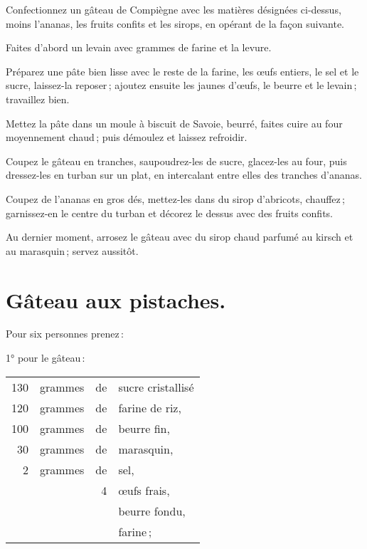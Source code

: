 Confectionnez un gâteau de Compiègne avec les matières désignées ci-dessus,
moins l'ananas, les fruits confits et les sirops, en opérant de la façon suivante.

Faites d'abord un levain avec {\mmm} grammes de farine et la levure.

Préparez une pâte bien lisse avec le reste de la farine, les œufs entiers, le
sel et le sucre, laissez-la reposer ; ajoutez ensuite les jaunes d'œufs, le
beurre et le levain ; travaillez bien.

Mettez la pâte dans un moule à biscuit de Savoie, beurré, faites cuire au four
moyennement chaud ; puis démoulez et laissez refroidir.

Coupez le gâteau en tranches, saupoudrez-les de sucre, glacez-les au four, puis
dressez-les en turban sur un plat, en intercalant entre elles des tranches
d'ananas.

Coupez de l'ananas en gros dés, mettez-les dans du sirop d'abricots, chauffez ;
garnissez-en le centre du turban et décorez le dessus avec des fruits confits.

Au dernier moment, arrosez le gâteau avec du sirop chaud parfumé au kirsch et
au marasquin ; servez aussitôt.

\section*{\centering Gâteau aux pistaches.}
{}

Pour six personnes prenez :

\medskip

1° pour le gâteau :

\footnotesize
\begin{longtable}{rrrp{16em}}
    130 & grammes & de & sucre cristallisé                                                                \\
    120 & grammes & de & farine de riz,                                                                   \\
    100 & grammes & de & beurre fin,                                                                      \\
     30 & grammes & de & marasquin,                                                                       \\
      2 & grammes & de & sel,                                                                             \\
        &         &  4 & œufs frais,                                                                      \\
        &         &    & beurre fondu,                                                                    \\
        &         &    & farine ;                                                                         \\
\end{longtable}
\normalsize

